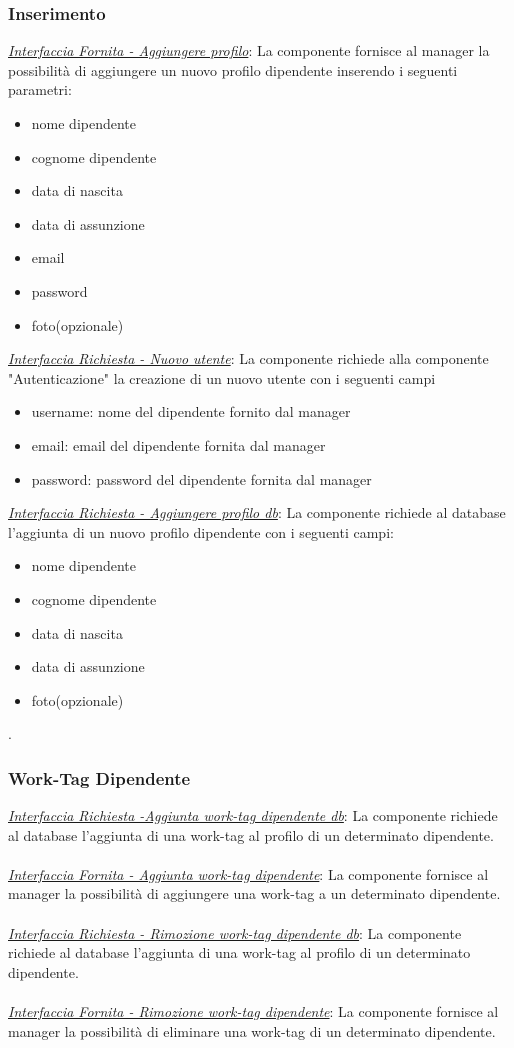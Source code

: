 \documentclass{report}
\begin{document}
\subsubsection*{\indent \indent Inserimento}
\uline{\textit{Interfaccia Fornita - Aggiungere profilo}}:
La componente fornisce al manager la possibilità di aggiungere un nuovo profilo dipendente inserendo i seguenti parametri:
\begin{itemize}
	\item nome dipendente
	\item cognome dipendente
	\item data di nascita
	\item data di assunzione
	\item email 
	\item password
	\item foto(opzionale)
\end{itemize}
\uline{\textit{Interfaccia Richiesta - Nuovo utente}}: 
La componente richiede alla componente "Autenticazione" la creazione di un nuovo utente con i seguenti campi
\begin{itemize}
	\item username: nome del dipendente fornito dal manager
	\item email: email del dipendente fornita dal manager
	\item password: password del dipendente fornita dal manager
\end{itemize}
\uline{\textit{Interfaccia Richiesta - Aggiungere profilo db}}:
La componente richiede al database l'aggiunta di un nuovo profilo dipendente con i seguenti campi:
\begin{itemize}
	\item nome dipendente
	\item cognome dipendente
	\item data di nascita
	\item data di assunzione
	\item foto(opzionale)
\end{itemize}.
\subsubsection*{\indent \indent Work-Tag Dipendente}
\uline{\textit{Interfaccia Richiesta -Aggiunta work-tag dipendente db}}:
La componente richiede al database l'aggiunta di una work-tag al profilo di un determinato dipendente.\\\\
\uline{\textit{Interfaccia Fornita - Aggiunta work-tag dipendente}}:
La componente fornisce al manager la possibilità di aggiungere una work-tag a un determinato dipendente.\\\\
\uline{\textit{Interfaccia Richiesta - Rimozione work-tag dipendente db}}:
La componente richiede al database l'aggiunta di una work-tag al profilo di un determinato dipendente.\\\\
\uline{\textit{Interfaccia Fornita - Rimozione work-tag dipendente}}:
La componente fornisce al manager la possibilità di eliminare una work-tag di un determinato dipendente.
\end{document}
